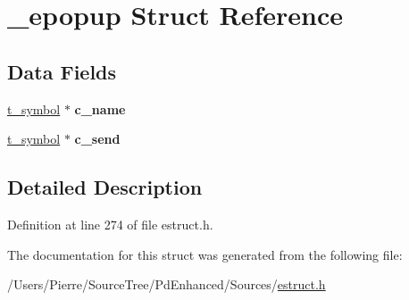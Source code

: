 \hypertarget{struct__epopup}{\section{\-\_\-epopup Struct Reference}
\label{struct__epopup}
}
\subsection*{Data Fields}
\begin{DoxyCompactItemize}
\item 
\hypertarget{struct__epopup_a6b1d595c3eed41231261cc949de6c059}{\hyperlink{struct__symbol}{t\-\_\-symbol} $\ast$ {\bfseries c\-\_\-name}}\label{struct__epopup_a6b1d595c3eed41231261cc949de6c059}

\item 
\hypertarget{struct__epopup_a8b8515ab22b24ef7b726fc06af1254fe}{\hyperlink{struct__symbol}{t\-\_\-symbol} $\ast$ {\bfseries c\-\_\-send}}\label{struct__epopup_a8b8515ab22b24ef7b726fc06af1254fe}

\end{DoxyCompactItemize}


\subsection{Detailed Description}


Definition at line 274 of file estruct.\-h.



The documentation for this struct was generated from the following file\-:\begin{DoxyCompactItemize}
\item 
/\-Users/\-Pierre/\-Source\-Tree/\-Pd\-Enhanced/\-Sources/\hyperlink{estruct_8h}{estruct.\-h}\end{DoxyCompactItemize}
